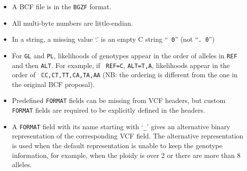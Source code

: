 \documentclass[10pt,pdftex]{article}
\begin{document}
\begin{itemize}
\item A BCF file is in the {\tt BGZF} format.
\item All multi-byte numbers are little-endian.
\item In a string, a missing value `.' is an empty C string ``{\tt
     0}'' (not ``{\tt . 0}'')
\item For {\tt GL} and {\tt PL}, likelihoods of genotypes appear in the
  order of alleles in {\tt REF} and then {\tt ALT}. For example, if {\tt
    REF=C}, {\tt ALT=T,A}, likelihoods appear in the order of {\tt
    CC,CT,TT,CA,TA,AA} (NB: the ordering is different from the one in the original
	BCF proposal).
\item Predefined {\tt FORMAT} fields can be missing from VCF headers, but custom {\tt FORMAT} fields
	are required to be explicitly defined in the headers.
\item A {\tt FORMAT} field with its name starting with `{\tt \_}' gives an alternative
	binary representation of the corresponding VCF field. The alternative representation
	is used when the default representation is unable to keep the genotype information,
	for example, when the ploidy is over 2 or there are more than 8 alleles.
\end{itemize}
\end{document}
